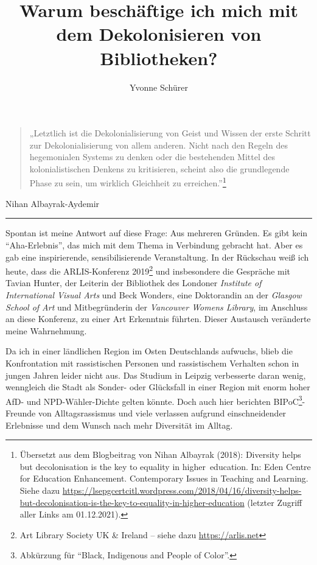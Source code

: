 \documentclass[a4paper,
fontsize=11pt,
oneside,
numbers=noperiodatend,
parskip=half-,
bibliography=totoc,
final
]{scrartcl}
\title{\LARGE{Warum beschäftige ich mich mit dem Dekolonisieren von Bibliotheken?}}%
\author{Yvonne Schürer} %
\date{}
\begin{document}
\maketitle
\thispagestyle{fancyplain} 


\begin{quote}
„Letztlich ist die Dekolonialisierung von Geist und Wissen der erste
Schritt zur Dekolonialisierung von allem anderen. Nicht nach den Regeln
des hegemonialen Systems zu denken oder die bestehenden Mittel des
kolonialistischen Denkens zu kritisieren, scheint also die grundlegende
Phase zu sein, um wirklich Gleichheit zu erreichen.''\footnote{Übersetzt
  aus dem Blogbeitrag von Nihan Albayrak (2018): Diversity helps but
  decolonisation is the key to equality in higher~education. In: Eden
  Centre for Education Enhancement. Contemporary Issues in Teaching and
  Learning. Siehe dazu
  \url{https://lsepgcertcitl.wordpress.com/2018/04/16/diversity-helps-but-decolonisation-is-the-key-to-equality-in-higher-education}
  (letzter Zugriff aller Links am 01.12.2021).}
\end{quote}
\begin{flushright}Nihan Albayrak-Aydemir\end{flushright}

\begin{center}\rule{0.5\linewidth}{0.5pt}\end{center}

Spontan ist meine Antwort auf diese Frage: Aus mehreren Gründen. Es gibt
kein \enquote{Aha-Erlebnis}, das mich mit dem Thema in Verbindung
gebracht hat. Aber es gab eine inspirierende, sensibilisierende
Veranstaltung. In der Rückschau weiß ich heute, dass die ARLIS-Konferenz
2019\footnote{Art Library Society UK \& Ireland -- siehe dazu
  \url{https://arlis.net}} und insbesondere die Gespräche mit Tavian
Hunter, der Leiterin der Bibliothek des Londoner \emph{Institute of
International Visual Arts} und Beck Wonders, eine Doktorandin an der
\emph{Glasgow School of Art} und Mitbegründerin der \emph{Vancouver
Womens Library}, im Anschluss an diese Konferenz, zu einer Art
Erkenntnis führten. Dieser Austausch veränderte meine Wahrnehmung.

Da ich in einer ländlichen Region im Osten Deutschlands aufwuchs, blieb
die Konfrontation mit rassistischen Personen und rassistischem Verhalten
schon in jungen Jahren leider nicht aus. Das Studium in Leipzig
verbesserte daran wenig, wenngleich die Stadt als Sonder- oder
Glücksfall in einer Region mit enorm hoher AfD- und NPD-Wähler-Dichte
gelten könnte. Doch auch hier berichten BIPoC\footnote{Abkürzung für
  \enquote{Black, Indigenous and People of Color}.}-Freunde von
Alltagsrassismus und viele verlassen aufgrund einschneidender Erlebnisse
und dem Wunsch nach mehr Diversität im Alltag.
\end{document}
